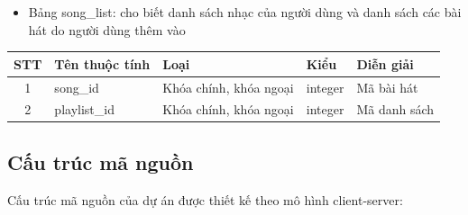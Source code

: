 \documentclass[a4paper]{article}
\begin{document}
\begin{itemize}
    \item Bảng song\_list: cho biết danh sách nhạc của người dùng và danh sách các bài hát do người dùng thêm vào
\end{itemize}
\begin{tabular}{cllll}
\toprule
  STT & Tên thuộc tính  & Loại & Kiểu & Diễn giải   \\
  \midrule
    1    & song\_id  & Khóa chính, khóa ngoại & integer & Mã bài hát \\
  2  & playlist\_id    & Khóa chính, khóa ngoại & integer & Mã danh sách  \\
   \bottomrule
\end{tabular}

\subsection{Cấu trúc mã nguồn}
Cấu trúc mã nguồn của dự án được thiết kế theo mô hình client-server:
\end{document}
